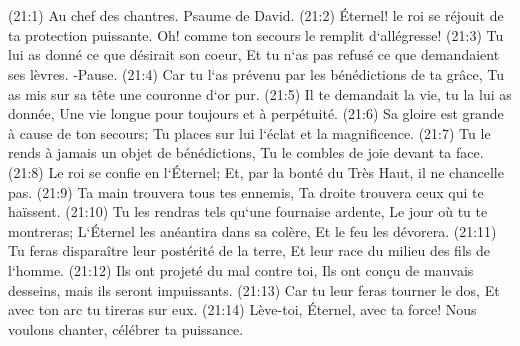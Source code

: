\chapter{}

\verse (21:1) Au chef des chantres. Psaume de David. (21:2) Éternel! le roi se réjouit de ta protection puissante. Oh! comme ton secours le remplit d`allégresse! 
\verse (21:3) Tu lui as donné ce que désirait son coeur, Et tu n`as pas refusé ce que demandaient ses lèvres. -Pause. 
\verse (21:4) Car tu l`as prévenu par les bénédictions de ta grâce, Tu as mis sur sa tête une couronne d`or pur. 
\verse (21:5) Il te demandait la vie, tu la lui as donnée, Une vie longue pour toujours et à perpétuité. 
\verse (21:6) Sa gloire est grande à cause de ton secours; Tu places sur lui l`éclat et la magnificence. 
\verse (21:7) Tu le rends à jamais un objet de bénédictions, Tu le combles de joie devant ta face. 
\verse (21:8) Le roi se confie en l`Éternel; Et, par la bonté du Très Haut, il ne chancelle pas. 
\verse (21:9) Ta main trouvera tous tes ennemis, Ta droite trouvera ceux qui te haïssent. 
\verse (21:10) Tu les rendras tels qu`une fournaise ardente, Le jour où tu te montreras; L`Éternel les anéantira dans sa colère, Et le feu les dévorera. 
\verse (21:11) Tu feras disparaître leur postérité de la terre, Et leur race du milieu des fils de l`homme. 
\verse (21:12) Ils ont projeté du mal contre toi, Ils ont conçu de mauvais desseins, mais ils seront impuissants. 
\verse (21:13) Car tu leur feras tourner le dos, Et avec ton arc tu tireras sur eux. 
\verse (21:14) Lève-toi, Éternel, avec ta force! Nous voulons chanter, célébrer ta puissance. 

\chapter{}

